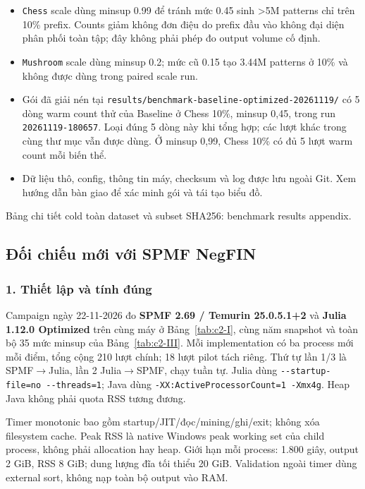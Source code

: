 \begin{itemize}
\tightlist
\item
  \texttt{Chess} scale dùng minsup 0.99 để tránh mức 0.45 sinh \textgreater5M patterns chỉ trên 10\% prefix. Counts giảm không đơn điệu do prefix đầu vào không đại diện phân phối toàn tập; đây không phải phép đo output volume cố định.
\item
  \texttt{Mushroom} scale dùng minsup 0.2; mức cũ 0.15 tạo 3.44M patterns ở 10\% và không được dùng trong paired scale run.
\item
  Gói đã giải nén tại \nolinkurl{results/benchmark-baseline-optimized-20261119/} có 5 dòng warm count thử của Baseline ở Chess 10\%, minsup 0,45, trong run \texttt{20261119-180657}. Loại đúng 5 dòng này khi tổng hợp; các lượt khác trong cùng thư mục vẫn được dùng. Ở minsup 0,99, Chess 10\% có đủ 5 lượt warm count mỗi biến thể.
\item
  Dữ liệu thô, config, thông tin máy, checksum và log được lưu ngoài Git. Xem hướng dẫn bàn giao để xác minh gói và tái tạo biểu đồ.
\end{itemize}

Bảng chi tiết cold toàn dataset và subset SHA256: benchmark results appendix.

\subsection{Đối chiếu mới với SPMF NegFIN}

\subsubsection{1. Thiết lập và tính đúng}

Campaign ngày 22-11-2026 đo \textbf{SPMF 2.69 / Temurin 25.0.5.1+2} và \textbf{Julia 1.12.0 Optimized} trên cùng máy ở Bảng~\ref{tab:c2-I}, cùng năm snapshot và toàn bộ 35 mức minsup của Bảng~\ref{tab:c2-III}. Mỗi implementation có ba process mới mỗi điểm, tổng cộng 210 lượt chính; 18 lượt pilot tách riêng. Thứ tự lần 1/3 là SPMF$\rightarrow$Julia, lần 2 Julia$\rightarrow$SPMF, chạy tuần tự. Julia dùng \texttt{-\/-startup-file=no\ -\/-threads=1}; Java dùng \texttt{-XX:ActiveProcessorCount=1\ -Xmx4g}. Heap Java không phải quota RSS tương đương.

Timer monotonic bao gồm startup/JIT/đọc/mining/ghi/exit; không xóa filesystem cache. Peak RSS là native Windows peak working set của child process, không phải allocation hay heap. Giới hạn mỗi process: 1.800 giây, output 2 GiB, RSS 8 GiB; dung lượng đĩa tối thiểu 20 GiB. Validation ngoài timer dùng external sort, không nạp toàn bộ output vào RAM.


